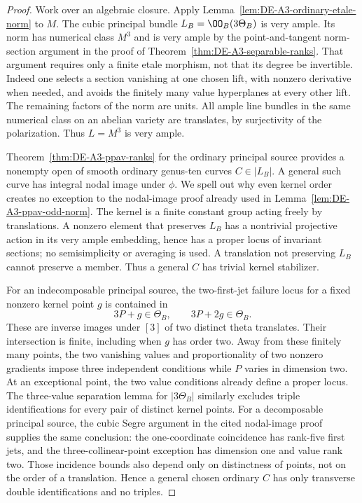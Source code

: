 \begin{proof}
Work over an algebraic closure.  Apply
Lemma~\ref{lem:DE-A3-ordinary-etale-norm} to $M$.
The cubic principal bundle $L_B=\OO_B(3\Theta_B)$ is very ample.
Its norm has numerical class $M^3$ and is very ample by the
point-and-tangent norm-section argument in the proof of
Theorem~\ref{thm:DE-A3-separable-ranks}.  That argument requires
only a finite etale morphism, not that its degree be invertible.
Indeed one selects a section vanishing at one chosen lift, with
nonzero derivative when needed, and avoids the finitely many value
hyperplanes at every other lift.  The remaining factors of the norm
are units.  All ample line bundles in the same numerical class on
an abelian variety are translates, by surjectivity of the polarization.
Thus $L=M^3$ is very ample.

Theorem~\ref{thm:DE-A3-ppav-ranks} for the ordinary principal source
provides a nonempty open of smooth ordinary genus-ten curves
$C\in|L_B|$.  A general such curve has integral nodal image under
$\phi$.  We spell out why even kernel order creates no exception
to the nodal-image proof already used in
Lemma~\ref{lem:DE-A3-ppav-odd-norm}.
The kernel is a finite constant group acting freely by translations.
A nonzero element that preserves $L_B$ has a nontrivial projective
action in its very ample embedding, hence has a proper locus of
invariant sections; no semisimplicity or averaging is used.
A translation not preserving $L_B$ cannot preserve a member.
Thus a general $C$ has trivial kernel stabilizer.

For an indecomposable principal source, the two-first-jet failure
locus for a fixed nonzero kernel point $g$ is contained in
\[
                   3P+g\in\Theta_B,
                   \qquad 3P+2g\in\Theta_B.
\]
These are inverse images under $[3]$ of two distinct theta translates.
Their intersection is finite, including when $g$ has order two.
Away from these finitely many points, the two vanishing values and
proportionality of two nonzero gradients impose three independent
conditions while $P$ varies in dimension two.  At an exceptional
point, the two value conditions already define a proper locus.
The three-value separation lemma for $|3\Theta_B|$ similarly
excludes triple identifications for every pair of distinct kernel
points.  For a decomposable principal source, the cubic Segre
argument in the cited nodal-image proof supplies the same conclusion:
the one-coordinate coincidence has rank-five first jets, and the
three-collinear-point exception has dimension one and value rank two.
Those incidence bounds also depend only on distinctness of points,
not on the order of a translation.  Hence a general chosen ordinary
$C$ has only transverse double identifications and no triples.


\end{proof}
